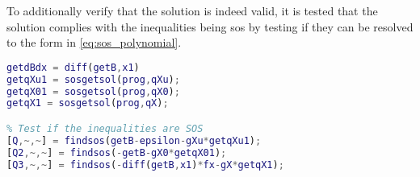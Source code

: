 To additionally verify that the solution is indeed valid, it is tested that the solution complies with the inequalities being \gls{sos} by testing if they can be resolved to the form in \autoref{eq:sos_polynomial}.
\begin{lstlisting}[language=matlab]
% Get coefficients for the remaining polynomials
getdBdx = diff(getB,x1)
getqXu1 = sosgetsol(prog,qXu);
getqX01 = sosgetsol(prog,qX0);
getqX1 = sosgetsol(prog,qX);

% Test if the inequalities are SOS
[Q,~,~] = findsos(getB-epsilon-gXu*getqXu1);
[Q2,~,~] = findsos(-getB-gX0*getqX01);
[Q3,~,~] = findsos(-diff(getB,x1)*fx-gX*getqX1);
\end{lstlisting}
%
%
%
%
%
%
%
%
%

